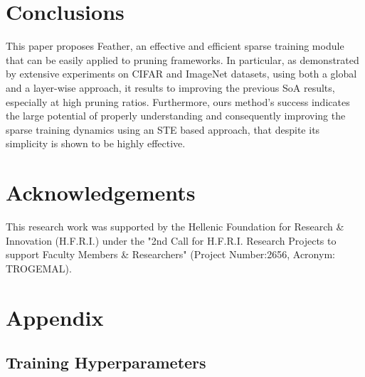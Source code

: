 \documentclass{article}
\begin{document}
\section{Conclusions }



This paper proposes Feather, an effective and efficient sparse training module that can be easily applied to pruning frameworks. In particular, as demonstrated by extensive experiments on CIFAR and ImageNet datasets, using both a global and a layer-wise approach, it results to improving the previous SoA results, especially at high pruning ratios. Furthermore, ours method's success indicates the large potential of properly understanding and consequently improving the sparse training dynamics using an STE based approach, that despite its simplicity is shown to be highly effective. 


\section*{Acknowledgements}

This research work was supported by the Hellenic Foundation for Research \& Innovation (H.F.R.I.) under the "2nd Call for H.F.R.I. Research Projects to support Faculty Members \& Researchers" (Project Number:2656, Acronym: TROGEMAL).





  

\vfill

\pagebreak


\appendix


\section{Appendix}

\subsection{Training Hyperparameters}
\end{document}
